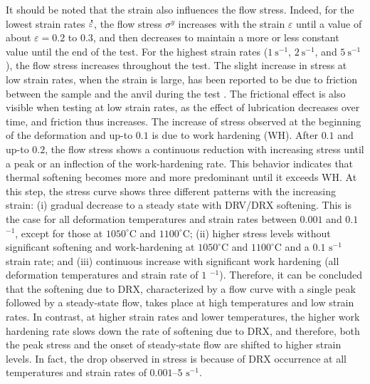 \documentclass[twoside,english,1p,final,sort&compress]{elsarticle}
\theoremstyle{plain}
\DeclareRobustCommand{\mdot}[1]{\accentset{\mbox{\bfseries .}}{#1}}
\DeclareRobustCommand{\ps}{\text{s}^{-1}}
\begin{document}
It should be noted that the strain also influences the flow stress.
Indeed, for the lowest strain rates $\mdot\varepsilon$, the flow stress $\sigma^y$ increases with the strain $\varepsilon$ until a value of about $\varepsilon=0.2$ to $0.3$, and then decreases to maintain a more or less constant value until the end of the test.
For the highest strain rates ($1~\ps$, $2~\ps$, and $5~\ps$), the flow stress increases throughout the test.
The slight increase in stress at low strain rates, when the strain is large, has been reported to be due to friction between the sample and the anvil during the test \cite{buckley2001deformation}.
The frictional effect is also visible when testing at low strain rates, as the effect of lubrication decreases over time, and friction thus increases.
The increase of stress observed at the beginning of the deformation and up-to $0.1$ is due to work hardening (WH).
After $0.1$ and up-to $0.2$, the flow stress shows a continuous reduction with increasing stress until a peak or an inflection of the work-hardening rate.
This behavior indicates that thermal softening becomes more and more predominant until it exceeds WH.
At this step, the stress curve shows three different patterns with the increasing strain: (i) gradual decrease to a steady state with DRV/DRX softening.
This is the case for all deformation temperatures and strain rates between $0.001$ and $0.1$ $^{-1}$, except for those at $1050^\circ$C and $1100^\circ$C; (ii) higher stress levels without significant softening and work-hardening at $1050^\circ$C and $1100^\circ$C and a $0.1$ $\text{s}^{-1}$ strain rate; and (iii) continuous increase with significant work hardening (all deformation temperatures and strain rate of $1$ $^{-1}$).
Therefore, it can be concluded that the softening due to DRX, characterized by a flow curve with a single peak followed by a steady-state flow, takes place at high temperatures and low strain rates.
In contrast, at higher strain rates and lower temperatures, the higher work hardening rate slows down the rate of softening due to DRX, and therefore, both the peak stress and the onset of steady-state flow are shifted to higher strain levels.
In fact, the drop observed in
stress is because of DRX occurrence at all temperatures and strain rates of $0.001$–$5$ $\text{s}^{-1}$.
\end{document}

